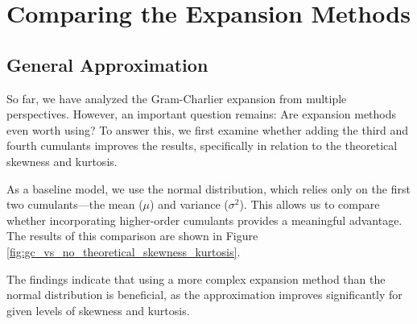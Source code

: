\section{Comparing the Expansion Methods}

\subsection{General Approximation}
So far, we have analyzed the Gram-Charlier expansion from multiple perspectives. However, an important question remains: Are expansion methods even worth using? To answer this, we first examine whether adding the third and fourth cumulants improves the results, specifically in relation to the theoretical skewness and kurtosis.

As a baseline model, we use the normal distribution, which relies only on the first two cumulants—the mean ($\mu$) and variance ($\sigma^2$). This allows us to compare whether incorporating higher-order cumulants provides a meaningful advantage. The results of this comparison are shown in Figure \ref{fig:gc_vs_no_theoretical_skewness_kurtosis}.

The findings indicate that using a more complex expansion method than the normal distribution is beneficial, as the approximation improves significantly for given levels of skewness and kurtosis.

